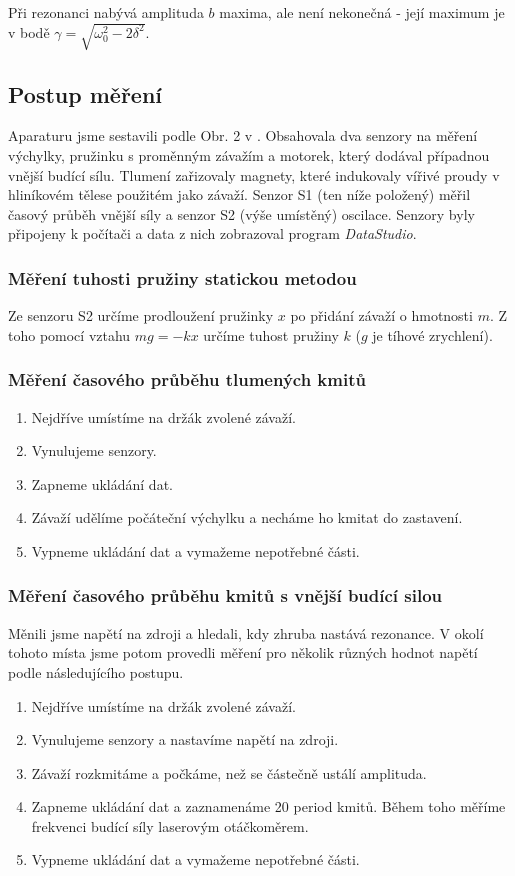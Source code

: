 \documentclass[english]{article}
\begin{document}
		Při rezonanci nabývá amplituda $b$ maxima, ale není nekonečná - její maximum je v bodě $\gamma = \sqrt{\omega_0^2 - 2\delta^2}$.
		
\subsection{Postup měření}
	Aparaturu jsme sestavili podle Obr. 2 v \cite{bib:zadani_1}. Obsahovala dva senzory na měření výchylky, pružinku s proměnným závažím a motorek, který dodával případnou vnější budící sílu. Tlumení zařizovaly magnety, které indukovaly vířivé proudy v hliníkovém tělese použitém jako závaží. Senzor S1 (ten níže položený) měřil časový průběh vnější síly a senzor S2 (výše umístěný) oscilace. Senzory byly připojeny k počítači a data z nich zobrazoval program \emph{DataStudio}. 
	
	\subsubsection{Měření tuhosti pružiny statickou metodou}
		Ze senzoru S2 určíme prodloužení pružinky $x$ po přidání závaží o hmotnosti $m$. Z toho pomocí vztahu $mg=-kx$ určíme tuhost pružiny $k$ ($g$ je tíhové zrychlení).
	\subsubsection{Měření časového průběhu tlumených kmitů}
		\begin{enumerate}
			\item Nejdříve umístíme na držák zvolené závaží.
			\item Vynulujeme senzory.
			\item Zapneme ukládání dat.
			\item Závaží udělíme počáteční výchylku a necháme ho kmitat do zastavení.
			\item Vypneme ukládání dat a vymažeme nepotřebné části.
		\end{enumerate}
	\subsubsection{Měření časového průběhu kmitů s vnější budící silou}
		Měnili jsme napětí na zdroji a hledali, kdy zhruba nastává rezonance. V okolí tohoto místa jsme potom provedli měření pro několik různých hodnot napětí podle následujícího postupu.
		\begin{enumerate}
			\item Nejdříve umístíme na držák zvolené závaží.
			\item Vynulujeme senzory a nastavíme napětí na zdroji.
			\item Závaží rozkmitáme a počkáme, než se částečně ustálí amplituda.
			\item Zapneme ukládání dat a zaznamenáme 20 period kmitů. Během toho měříme frekvenci budící síly laserovým otáčkoměrem. 
			\item Vypneme ukládání dat a vymažeme nepotřebné části.
		\end{enumerate}
	
\end{document}
